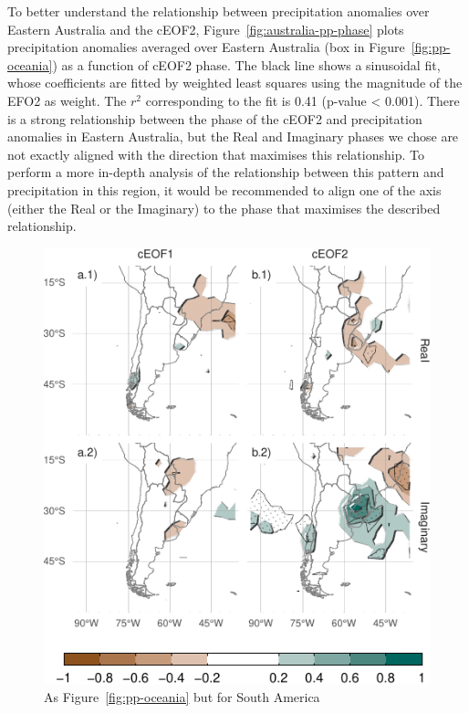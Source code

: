 \documentclass[smallextended]{svjour3}       %
\begin{document}
To better understand the relationship between precipitation anomalies over Eastern Australia and the cEOF2, Figure~\ref{fig:australia-pp-phase} plots precipitation anomalies averaged over Eastern Australia (box in Figure~\ref{fig:pp-oceania}) as a function of cEOF2 phase.
The black line shows a sinusoidal fit, whose coefficients are fitted by weighted least squares using the magnitude of the EFO2 as weight.
The \(r^2\) corresponding to the fit is 0.41 (p-value \textless{} 0.001).
There is a strong relationship between the phase of the cEOF2 and precipitation anomalies in Eastern Australia, but the Real and Imaginary phases we chose are not exactly aligned with the direction that maximises this relationship.
To perform a more in-depth analysis of the relationship between this pattern and precipitation in this region, it would be recommended to align one of the axis (either the Real or the Imaginary) to the phase that maximises the described relationship.



\begin{figure}
\centering
\includegraphics{../figures/pp-america-1.pdf}
\caption{\label{fig:pp-america}As Figure~\ref{fig:pp-oceania} but for South America}
\end{figure}
\end{document}
